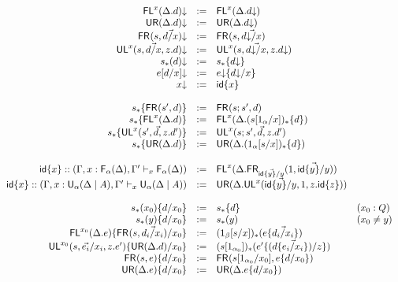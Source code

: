\begin{figure}
\begin{small}
\[
\begin{array}{rcll}
\mathsf{FL}^{x}(\Delta.d)\mathord{\downarrow} & := & \mathsf{FL}^{x}(\Delta.d\mathord{\downarrow})\\
\mathsf{UR}(\Delta.d)\mathord{\downarrow} & := & \mathsf{UR}(\Delta.d\mathord{\downarrow})\\
\mathsf{FR}_{}(s,\vec{d/x})\mathord{\downarrow} & := & \mathsf{FR}_{}(s,\vec{d\mathord{\downarrow}/x})\\
\mathsf{UL}^{x}_{}(s,\vec{d/x},z.d)\mathord{\downarrow} & := & {\mathsf{UL}^{x}_{}(s,\vec{d\mathord{\downarrow}/x},z.d\mathord{\downarrow})}\\
s_*(d)\mathord{\downarrow} & := & s_*\{d\mathord{\downarrow}\}\\
e[d/x]\mathord{\downarrow} & := & e\mathord{\downarrow}\{d\mathord{\downarrow}/x\}\\
{x}\mathord{\downarrow} & := & {\mathsf{id}\{x\}}\\
\\
s_*\{\mathsf{FR}_{}(s',d)\} & := & \mathsf{FR}_{}(s;s',d)\\
s_*\{\mathsf{FL}^{x}(\Delta.d)\} & := & \mathsf{FL}^{x}(\Delta.(s[1_\alpha/x])_*\{d\})\\
s_*\{\mathsf{UL}^{x}_{}(s',\vec{d},z.d')\} & := & {\mathsf{UL}^{x}_{}(s;s',\vec{d},z.d')}\\
s_*\{\mathsf{UR}(\Delta.d)\} & := & \mathsf{UR}(\Delta.(1_\alpha[s/x])_*\{d\}) \\
\\
{\mathsf{id}\{x\}} :: (\Gamma,x:\mathsf{F}_{\alpha}(\Delta),\Gamma' \vdash_{x} \mathsf{F}_{\alpha}(\Delta)) & := & \mathsf{FL}^{x}(\Delta.\mathsf{FR}_{\vec{{\mathsf{id}\{y\}}/y}}(1,\vec{{\mathsf{id}\{y\}}/y}))\\
{\mathsf{id}\{x\}} :: (\Gamma,x:\mathsf{U}_{\alpha}(\Delta \mid A),\Gamma' \vdash_{x} \mathsf{U}_{\alpha}(\Delta \mid A)) & := & \mathsf{UR}(\Delta.\mathsf{UL}^{x}_{}(\vec{{\mathsf{id}\{y\}}/y},1,z.{\mathsf{id}\{z\}})) \\
\\
s_*(x_0)\{d/x_0\} & := & s_*\{d\} & (x_0 : Q)\\
s_*(y)\{d/x_0\} & := & s_*(y) & (x_0 \neq y)\\
\mathsf{FL}^{x_0}(\Delta.e)\{\mathsf{FR}_{}(s,\vec{d_i/x_i})/x_0\} & := & (1_\beta[s/x])_*(e\{\vec{d_i/x_i}\}) \\
\mathsf{UL}^{x_0}_{}(s,\vec{e_i}/x_i,z.e')\{\mathsf{UR}(\Delta.d)/x_0\} & := & (s[1_{\alpha_0}])_*(e'\{(d\{{\vec{e_i/x_i}}\})/z\}) &  \\
\mathsf{FR}_{}(s,e)\{d/x_0\} & := & {\mathsf{FR}_{}(s[1_{\alpha_0}/x_0],e\{d/x_0\})}\\
\mathsf{UR}(\Delta.e)\{d/x_0\} & := & \mathsf{UR}(\Delta.e\{d/x_0\})\\

\end{array}\]
\end{small}
\end{figure}

